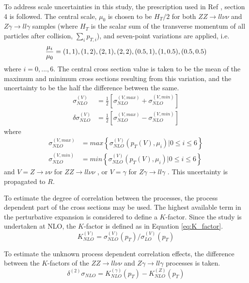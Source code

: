 \documentclass[11pt,a4paper,openright,twoside]{report}
\newcommand{\ZZ}{$ZZ\to ll\nu\nu$ }
\newcommand{\Zg}{$Z\gamma\to ll\gamma$ }
\begin{document}
To address scale uncertainties in this study, the prescription used in Ref \cite{precise_scale}, section 4 is followed. The central scale, $\mu_0$ is chosen to be $H_{T}/2$ for both \ZZ and \Zg samples (where $H_T$ is the scalar sum of the transverse momentum of all particles after collision, $\sum_{i} p_{T,i}$), and seven-point variations are applied, i.e.
\begin{equation}
\frac{\mu_i}{\mu_0} = (1,1),(1,2),(2,1),(2,2),(0.5,1),(1,0.5),(0.5,0.5)\\
\label{eq:scale}
\end{equation}
where $i=0,...,6$. The central cross section value is taken to be the mean of the maximum and minimum cross sections resulting from this variation, and the uncertainty to be the half the difference between the same.
\begin{align}
\sigma_{NLO}^{(V)} &= \frac{1}{2}\left[\sigma_{NLO}^{(V,max)} + \sigma_{NLO}^{(V,min)}\right]\label{eq:scale_central}\\
\delta\sigma_{NLO}^{(V)} &= \frac{1}{2}\left[\sigma_{NLO}^{(V,max)} - \sigma_{NLO}^{(V,min)}\right]
\label{eq:scale_central2}
\end{align}
where
\begin{align}
\sigma_{NLO}^{(V,max)} &= max\left\lbrace\sigma_{NLO}^{(V)}(p_{T}(V),\mu_i)|0\leq i \leq 6\right\rbrace\\
\sigma_{NLO}^{(V,min)} &= min\left\lbrace\sigma_{NLO}^{(V)}(p_{T}(V),\mu_i)|0\leq i \leq 6\right\rbrace
\end{align}
and $V = Z\to\nu\nu$ for \ZZ, or $V = \gamma$ for \Zg. This uncertainty is propagated to $R$.

To estimate the degree of correlation between the processes, the process dependent part of the cross sections may be used. The highest available term in the perturbative expansion is considered to define a $K$-factor. Since the study is undertaken at NLO, the $K$-factor is defined as in Equation \ref{eq:K_factor}.
\begin{equation}
K_{NLO}^{(V)} = \sigma_{NLO}^{(V)}(p_T)/\sigma_{LO}^{(V)}(p_T)
\label{eq:K_factor}
\end{equation}

To estimate the unknown process dependent correlation effects, the difference between the $K$-factors of the \ZZ and \Zg processes is taken.
\begin{equation}
\delta^{(2)} \sigma_{NLO} = K_{NLO}^{(\gamma)}(p_T) - K_{NLO}^{(Z)}(p_T)
\label{eq:K_factor_unc}
\end{equation}
\end{document}
